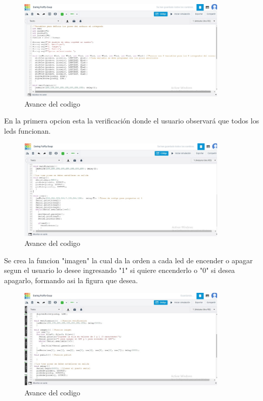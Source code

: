 \documentclass{article}
\begin{document}
\begin{figure}[h]
\includegraphics[width=10cm]{Avance 1.jpeg}
\centering
\caption{Avance del codigo}
\label{fig:Avance 1}
\end{figure}
\newpage

En la primera opcion esta la verificación donde el usuario observará que todos los leds funcionan.

\begin{figure}[h]
\includegraphics[width=10cm]{Avance 2.jpeg}
\centering
\caption{Avance del codigo}
\label{fig:Avance 2}
\end{figure}


Se crea la funcion "imagen" la cual da la orden a cada led de encender o apagar segun el usuario lo desee ingresando "1" si quiere encenderlo o "0" si desea apagarlo, formando asi la figura que desea.

\begin{figure}[h]
\includegraphics[width=10cm]{Imagen.jpeg}
\centering
\caption{Avance del codigo}
\label{fig:Imagen}
\end{figure}
\end{document}

